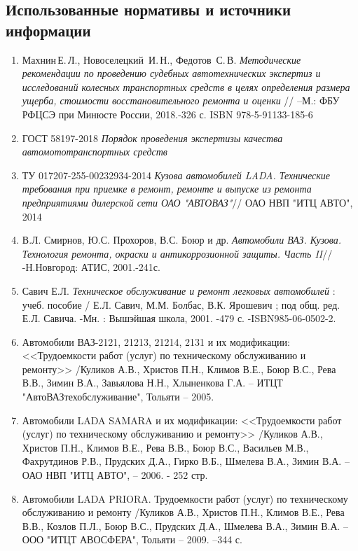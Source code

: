 
\subsection{Использованные нормативы и источники информации}
%
\begin{enumerate}
\begin{flushright}
	
\end{flushright}
\item 
Махнин\,Е.\,Л., Новоселецкий\, И.\,Н., Федотов\, С.\,В. \emph{Методические рекомендации по проведению судебных автотехнических экспертиз и исследований колесных транспортных средств в целях определения размера ущерба, стоимости восстановительного ремонта и оценки} // --М.: ФБУ РФЦСЭ при Минюсте России, 2018.-326 с.  ISBN 978-5-91133-185-6
%
%
%
\item ГОСТ 58197-2018 \emph{Порядок проведения экспертизы качества автомототранспортных средств}
%
\item ТУ 017207-255-00232934-2014 \emph{Кузова автомобилей LADA. Технические требования при приемке в ремонт, ремонте и выпуске из ремонта предприятиями дилерской сети ОАО "АВТОВАЗ"}//  ОАО НВП "ИТЦ АВТО", 2014
%
\item В.Л. Смирнов, Ю.С. Прохоров, В.С. Боюр и др. \emph{Автомобили ВАЗ. Кузова. Технология ремонта, окраски и  антикоррозионной защиты. Часть II}// -Н.Новгород: АТИС, 2001.-241с.
%
\item 
Савич Е.Л. \emph{Техническое  обслуживание  и  ремонт  легковых  автомобилей}  : учеб. пособие / Е.Л. Савич, М.М. Болбас, В.К. Ярошевич ; под общ. ред. Е.Л. Савича. -Мн. : Вышэйшая школа,  2001. -479 с. -ISBN985-06-0502-2.
%
\item 
Автомобили ВАЗ-2121, 21213, 21214, 2131 и их модификации: <<Трудоемкости работ (услуг) по техническому обслуживанию и ремонту>> /Куликов А.В., Христов П.Н., Климов В.Е.,  Боюр В.С., Рева В.В., Зимин В.А., Завьялова Н.Н., Хлыненкова Г.А. -- ИТЦТ "АвтоВАЗтехобслуживание", Тольяти -- 2005. 
%
\item
Автомобили LADA SAMARA и их модификации: <<Трудоемкости работ (услуг) по техническому обслуживанию и ремонту>> /Куликов А.В., Христов П.Н., Климов В.Е., Рева В.В., Боюр В.С., Васильев М.В., Фахрутдинов Р.В.,  Прудских Д.А., Гирко В.Б., Шмелева В.А., Зимин В.А. --ОАО НВП "ИТЦ АВТО",  -- 2006. - 252 стр.
%
\item 
Автомобили LADA PRIORA. Трудоемкости работ (услуг) по техническому обслуживанию и ремонту /Куликов А.В., Христов П.Н., Климов В.Е., Рева В.В., Козлов П.Л., Боюр В.С., Прудских Д.А., Шмелева В.А., Зимин В.А. -- ООО "ИТЦТ АВОСФЕРА", Тольяти -- 2009. --344 с.

\end{enumerate}
